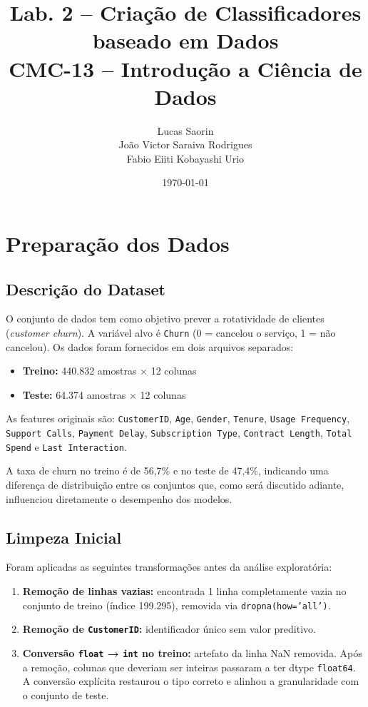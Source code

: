 \documentclass[12pt, a4paper]{article}
\title{\textbf{Lab. 2 -- Criação de Classificadores baseado em Dados} \\[0.5cm]
\large CMC-13 -- Introdução a Ciência de Dados}
\author{
  Lucas Saorin \\
  João Victor Saraiva Rodrigues \\
  Fabio Eiiti Kobayashi Urio
}
\date{\today}
\begin{document}
\maketitle
\tableofcontents
\newpage

\section{Preparação dos Dados}

\subsection{Descrição do Dataset}

O conjunto de dados tem como objetivo prever a rotatividade de clientes (\textit{customer churn}).
A variável alvo é \texttt{Churn} (0 = cancelou o serviço, 1 = não cancelou).
Os dados foram fornecidos em dois arquivos separados:

\begin{itemize}
  \item \textbf{Treino:} 440.832 amostras × 12 colunas
  \item \textbf{Teste:}  64.374 amostras × 12 colunas
\end{itemize}

As features originais são: \texttt{CustomerID}, \texttt{Age}, \texttt{Gender},
\texttt{Tenure}, \texttt{Usage Frequency}, \texttt{Support Calls},
\texttt{Payment Delay}, \texttt{Subscription Type}, \texttt{Contract Length},
\texttt{Total Spend} e \texttt{Last Interaction}.

A taxa de churn no treino é de 56,7\% e no teste de 47,4\%, indicando uma diferença
de distribuição entre os conjuntos que, como será discutido adiante, influenciou
diretamente o desempenho dos modelos.

\subsection{Limpeza Inicial}

Foram aplicadas as seguintes transformações antes da análise exploratória:

\begin{enumerate}
  \item \textbf{Remoção de linhas vazias:} encontrada 1 linha completamente vazia
        no conjunto de treino (índice 199.295), removida via \texttt{dropna(how='all')}.

  \item \textbf{Remoção de \texttt{CustomerID}:} identificador único sem valor preditivo.

  \item \textbf{Conversão \texttt{float} → \texttt{int} no treino:} artefato da linha
        NaN removida. Após a remoção, colunas que deveriam ser inteiras passaram a
        ter dtype \texttt{float64}. A conversão explícita restaurou o tipo correto e
        alinhou a granularidade com o conjunto de teste.
\end{enumerate}
\end{document}
